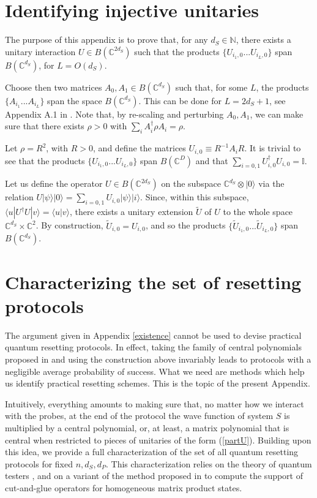\documentclass[twocolumn,prx,aps,longbibliography]{revtex4-1}
\def\C{{\mathbb C}}
\def\id{{\mathbb I}}
\def\N{\mathbb{N}}
\def\bra#1{\langle#1|} \def\ket#1{|#1\rangle}
\def\braket#1#2{\langle#1|#2\rangle}
\def\id{{\mathbb I}}
\begin{document}
\begin{appendix}
\section{Identifying injective unitaries}
\label{injectivity}
The purpose of this appendix is to prove that, for any $d_S\in\N$, there exists a unitary interaction $U\in B(\C^{2d_S})$ such that the products $\{U_{i_1,0}...U_{i_L,0}\}$ span $B(\C^{d_S})$, for $L=O(d_S)$.

Choose then two matrices $A_0,A_1\in B(\C^{d_S})$ such that, for some $L$, the products $\{A_{i_1}...A_{i_L}\}$ span the space $B(\C^{d_S})$. This can be done for $L=2d_S+1$, see Appendix A.1 in \cite{MPS}. Note that, by re-scaling and perturbing $A_0,A_1$, we can make sure that there exists $\rho>0$ with $\sum_i A^\dagger_i\rho A_i=\rho$. 

Let $\rho=R^2$, with $R>0$, and define the matrices $U_{i,0}\equiv R^{-1}A_i R$. It is trivial to see that the products $\{U_{i_1,0}...U_{i_L,0}\}$ span $B(\C^D)$ and that $\sum_{i=0,1}U^\dagger_{i,0}U_{i,0}=\id$.

Let us define the operator $U\in B(\C^{2d_S})$ on the subspace $\C^{d_S}\otimes \ket{0}$ via the relation $U\ket{\psi}\ket{0}=\sum_{i=0,1}U_{i,0}\ket{\psi}\ket{i}$. Since, within this subspace, $\bra{u}U^\dagger U\ket{v}=\braket{u}{v}$, there exists a unitary extension $\tilde{U}$ of $U$ to the whole space $\C^{d_S}\times\C^2$. By construction, $\tilde{U}_{i,0}=U_{i,0}$, and so the products $\{\tilde{U}_{i_1,0}...\tilde{U}_{i_L,0}\}$ span $B(\C^{d_S})$.



\section{Characterizing the set of resetting protocols}
\label{characterization}
The argument given in Appendix \ref{existence} cannot be used to devise practical quantum resetting protocols. In effect, taking the family of central polynomials proposed in \cite{polyId} and using the construction above invariably leads to protocols with a negligible average probability of success. What we need are methods which help us identify practical resetting schemes. This is the topic of the present Appendix.


Intuitively, everything amounts to making sure that, no matter how we interact with the probes, at the end of the protocol the wave function of system $S$ is multiplied by a central polynomial, or, at least, a matrix polynomial that is central when restricted to pieces of unitaries of the form (\ref{partU}). Building upon this idea, we provide a full characterization of the set of all quantum resetting protocols for fixed $n,d_S,d_P$. This characterization relies on the theory of quantum testers \cite{tester}, \cite{tester2} and on a variant of the method proposed in \cite{MPS} to compute the support of cut-and-glue operators for homogeneous matrix product states. 



\end{appendix}
\end{document}
